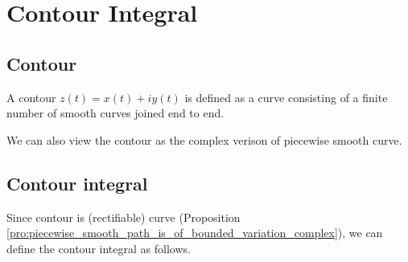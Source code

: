 



\section{Contour Integral}

\subsection{Contour}

\begin{definition}[contour]%
A contour $z(t) = x(t) + iy(t)$ is defined as a curve consisting of a finite number of smooth curves joined end to end.%
\end{definition}

\begin{remark}
We can also view the contour as the complex verison of piecewise smooth curve.
\end{remark}


\subsection{Contour integral}



Since contour is (rectifiable) curve (Proposition \ref{pro:piecewise_smooth_path_is_of_bounded_variation_complex}), we can define the contour integral as follows.%

